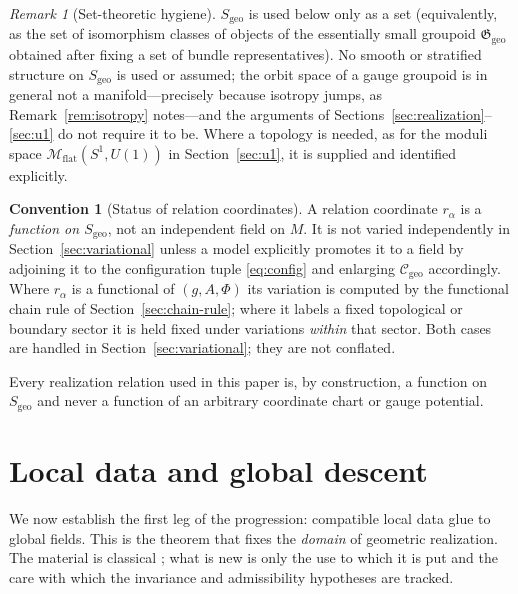 \documentclass[11pt,a4paper]{article}
\theoremstyle{plain}
\theoremstyle{definition}
\newtheorem{convention}[theorem]{Convention}
\theoremstyle{remark}
\newtheorem{remark}[theorem]{Remark}
\newcommand{\Ggeo}{\mathfrak{G}_{\mathrm{geo}}}
\newcommand{\Cgeo}{\mathcal{C}_{\mathrm{geo}}}
\newcommand{\Sgeo}{S_{\mathrm{geo}}}
\newcommand{\Mflat}{\mathcal{M}_{\mathrm{flat}}}
\begin{document}
\begin{remark}[Set-theoretic hygiene]
\label{rem:hygiene}
$\Sgeo$ is used below only as a set (equivalently, as the set of isomorphism classes of objects
of the essentially small groupoid $\Ggeo$ obtained after fixing a set of bundle
representatives). No smooth or stratified structure on $\Sgeo$ is used or assumed; the orbit
space of a gauge groupoid is in general not a manifold---precisely because isotropy jumps, as
Remark~\ref{rem:isotropy} notes---and the arguments of
Sections~\ref{sec:realization}--\ref{sec:u1} do not require it to be. Where a topology is
needed, as for the moduli space $\Mflat(S^1,U(1))$ in Section~\ref{sec:u1}, it is supplied and
identified explicitly.
\end{remark}

\begin{convention}[Status of relation coordinates]
\label{conv:relation-status}
A relation coordinate $r_\alpha$ is a \emph{function on $\Sgeo$}, not an independent field on
$M$. It is not varied independently in Section~\ref{sec:variational} unless a model explicitly
promotes it to a field by adjoining it to the configuration tuple \eqref{eq:config} and
enlarging $\Cgeo$ accordingly. Where $r_\alpha$ is a functional of $(g,A,\Phi)$ its variation is
computed by the functional chain rule of Section~\ref{sec:chain-rule}; where it labels a fixed
topological or boundary sector it is held fixed under variations \emph{within} that sector. Both
cases are handled in Section~\ref{sec:variational}; they are not conflated.
\end{convention}

Every realization relation used in this paper is, by construction, a function on $\Sgeo$ and
never a function of an arbitrary coordinate chart or gauge potential.

\section{Local data and global descent}
\label{sec:descent}

We now establish the first leg of the progression: compatible local data glue to global fields.
This is the theorem that fixes the \emph{domain} of geometric realization. The material is
classical \cite{KobayashiNomizu1,Steenrod,Bleecker}; what is new is only the use to which it is
put and the care with which the invariance and admissibility hypotheses are tracked.
\end{document}
